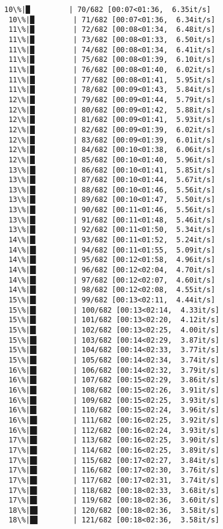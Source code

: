 \documentclass[11pt]{article}
\begin{document}
\begin{Verbatim}[commandchars=\\\{\}]
 10\%|█         | 70/682 [00:07<01:36,  6.35it/s]
 10\%|█         | 71/682 [00:07<01:36,  6.34it/s]
 11\%|█         | 72/682 [00:08<01:34,  6.48it/s]
 11\%|█         | 73/682 [00:08<01:33,  6.50it/s]
 11\%|█         | 74/682 [00:08<01:34,  6.41it/s]
 11\%|█         | 75/682 [00:08<01:39,  6.10it/s]
 11\%|█         | 76/682 [00:08<01:40,  6.02it/s]
 11\%|█▏        | 77/682 [00:08<01:41,  5.95it/s]
 11\%|█▏        | 78/682 [00:09<01:43,  5.84it/s]
 12\%|█▏        | 79/682 [00:09<01:44,  5.79it/s]
 12\%|█▏        | 80/682 [00:09<01:42,  5.88it/s]
 12\%|█▏        | 81/682 [00:09<01:41,  5.93it/s]
 12\%|█▏        | 82/682 [00:09<01:39,  6.02it/s]
 12\%|█▏        | 83/682 [00:09<01:39,  6.01it/s]
 12\%|█▏        | 84/682 [00:10<01:38,  6.06it/s]
 12\%|█▏        | 85/682 [00:10<01:40,  5.96it/s]
 13\%|█▎        | 86/682 [00:10<01:41,  5.85it/s]
 13\%|█▎        | 87/682 [00:10<01:44,  5.67it/s]
 13\%|█▎        | 88/682 [00:10<01:46,  5.56it/s]
 13\%|█▎        | 89/682 [00:10<01:47,  5.50it/s]
 13\%|█▎        | 90/682 [00:11<01:46,  5.56it/s]
 13\%|█▎        | 91/682 [00:11<01:48,  5.46it/s]
 13\%|█▎        | 92/682 [00:11<01:50,  5.34it/s]
 14\%|█▎        | 93/682 [00:11<01:52,  5.24it/s]
 14\%|█▍        | 94/682 [00:11<01:55,  5.09it/s]
 14\%|█▍        | 95/682 [00:12<01:58,  4.96it/s]
 14\%|█▍        | 96/682 [00:12<02:04,  4.70it/s]
 14\%|█▍        | 97/682 [00:12<02:07,  4.60it/s]
 14\%|█▍        | 98/682 [00:12<02:08,  4.55it/s]
 15\%|█▍        | 99/682 [00:13<02:11,  4.44it/s]
 15\%|█▍        | 100/682 [00:13<02:14,  4.33it/s]
 15\%|█▍        | 101/682 [00:13<02:20,  4.12it/s]
 15\%|█▍        | 102/682 [00:13<02:25,  4.00it/s]
 15\%|█▌        | 103/682 [00:14<02:29,  3.87it/s]
 15\%|█▌        | 104/682 [00:14<02:33,  3.77it/s]
 15\%|█▌        | 105/682 [00:14<02:34,  3.74it/s]
 16\%|█▌        | 106/682 [00:14<02:32,  3.79it/s]
 16\%|█▌        | 107/682 [00:15<02:29,  3.86it/s]
 16\%|█▌        | 108/682 [00:15<02:26,  3.91it/s]
 16\%|█▌        | 109/682 [00:15<02:25,  3.93it/s]
 16\%|█▌        | 110/682 [00:15<02:24,  3.96it/s]
 16\%|█▋        | 111/682 [00:16<02:25,  3.92it/s]
 16\%|█▋        | 112/682 [00:16<02:24,  3.93it/s]
 17\%|█▋        | 113/682 [00:16<02:25,  3.90it/s]
 17\%|█▋        | 114/682 [00:16<02:25,  3.89it/s]
 17\%|█▋        | 115/682 [00:17<02:27,  3.84it/s]
 17\%|█▋        | 116/682 [00:17<02:30,  3.76it/s]
 17\%|█▋        | 117/682 [00:17<02:31,  3.74it/s]
 17\%|█▋        | 118/682 [00:18<02:33,  3.68it/s]
 17\%|█▋        | 119/682 [00:18<02:36,  3.60it/s]
 18\%|█▊        | 120/682 [00:18<02:36,  3.58it/s]
 18\%|█▊        | 121/682 [00:18<02:36,  3.58it/s]

\end{Verbatim}
\end{document}

